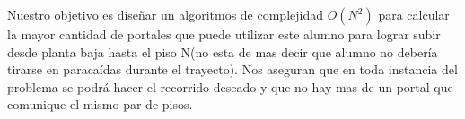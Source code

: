 Nuestro objetivo es diseñar un algoritmos de complejidad $O(N^2)$  para calcular la mayor cantidad de portales que puede utilizar este alumno para lograr subir desde planta baja hasta el piso N(no esta de mas decir que alumno no debería tirarse en paracaídas durante el trayecto).
Nos aseguran que en toda instancia del problema se podrá hacer el recorrido deseado y que no hay mas de un portal que comunique el mismo par de pisos.  










